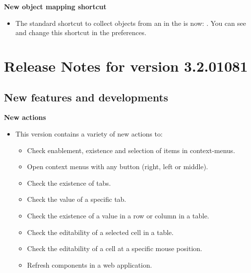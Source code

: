 \textbf{New object mapping shortcut}
\begin{itemize}
\item The standard shortcut to collect objects from an \gdaut{} in the \gdomm{} is now: . You can see and change this shortcut in the preferences. 
\end{itemize}

\makeatletter
\section{Release Notes for version 3.2.01081}
\makeatother

\subsection{New features and developments}
\textbf{New actions}
\begin{itemize}
\item This version contains a variety of new actions to:
\begin{itemize}
\item Check enablement, existence and selection of items in context-menus. 
\item Open context menus with any button (right, left or middle).
\item Check the existence of tabs.
\item Check the value of a specific tab.
\item Check the existence of a value in a row or column in a table. 
\item Check the editability of a selected cell in a table.
\item Check the editability of a cell at a specific mouse position. 
\item Refresh components in a web application.
\end{itemize}
\end{itemize}

